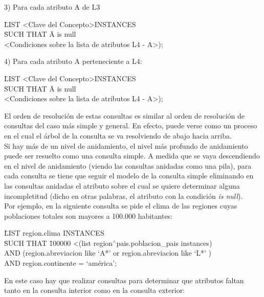 3) Para cada atributo A de L3 

\begin{tabbing}
\= LIST \textless Clave del Concepto\textgreater INSTANCES \\
\= SUCH THAT \= A is null \\
\> \> \textless Condiciones sobre la lista de atributos L4 - A\textgreater);
\end{tabbing}

4)  Para cada atributo A perteneciente a L4: 

\begin{tabbing}
\= LIST \textless Clave del Concepto\textgreater INSTANCES \\
\= SUCH THAT \= A is null \\
\> \> \textless Condiciones sobre la lista de atributos L4 - A\textgreater);
\end{tabbing}

El orden de resolución de estas consultas es similar al orden de resolución de consultas del caso más simple y general. En efecto, puede verse como un proceso en el cual el árbol de la consulta se va resolviendo de abajo hacia arriba.\\

Si hay más de un nivel de anidamiento, el nivel más profundo de anidamiento puede ser resuelto como una consulta simple. A medida que se vaya descendiendo en el nivel de anidamiento (viendo las consultas anidadas como una pila), para cada consulta se tiene que seguir el modelo de la consulta simple eliminando en las consultas anidadas el atributo sobre el cual se quiere determinar alguna incompletitud (dicho en otras palabras, el atributo con la condición \emph{is null}). \\
	
	Por ejemplo, en la siguiente consulta se pide el clima de las regiones cuyas poblaciones totales son mayores a 100.000 habitantes: \\

\begin{tabbing}
\= LIST region.clima INSTANCES \\
\= SUCH THAT \= 100000 \textless (list region$^\wedge$pais.poblacion\_pais instances) \\
\> \> AND (region.abreviacion like ‘A*’  or region.abreviacion like ‘L*’ ) \\
\> \> AND region.continente = ‘américa’;
\end{tabbing}

En este caso hay que realizar consultas para determinar que atributos faltan tanto en la consulta interior como en la consulta exterior:

